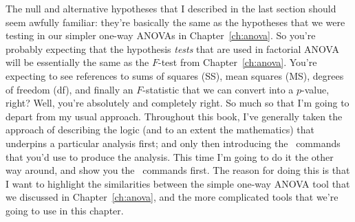 
The null and alternative hypotheses that I described in the last section should seem awfully familiar: they're basically the same as the hypotheses that we were testing in our simpler one-way ANOVAs in Chapter~\ref{ch:anova}. So you're probably expecting that the hypothesis {\it tests} that are used in factorial ANOVA will be essentially the same as the $F$-test from Chapter~\ref{ch:anova}. You're expecting to see references to sums of squares (SS), mean squares (MS), degrees of freedom (df), and finally an $F$-statistic that we can convert into a $p$-value, right? Well, you're absolutely and completely right. So much so that I'm going to depart from my usual approach. Throughout this book, I've generally taken the approach of describing the logic (and to an extent the mathematics) that underpins a particular analysis first; and only then introducing the \R\ commands that you'd use to produce the analysis. This time I'm going to do it the other way around, and show you the \R\ commands first. The reason for doing this is that I want to highlight the similarities between the simple one-way ANOVA tool that we discussed in Chapter~\ref{ch:anova}, and the more complicated tools that we're going to use in this chapter. 

